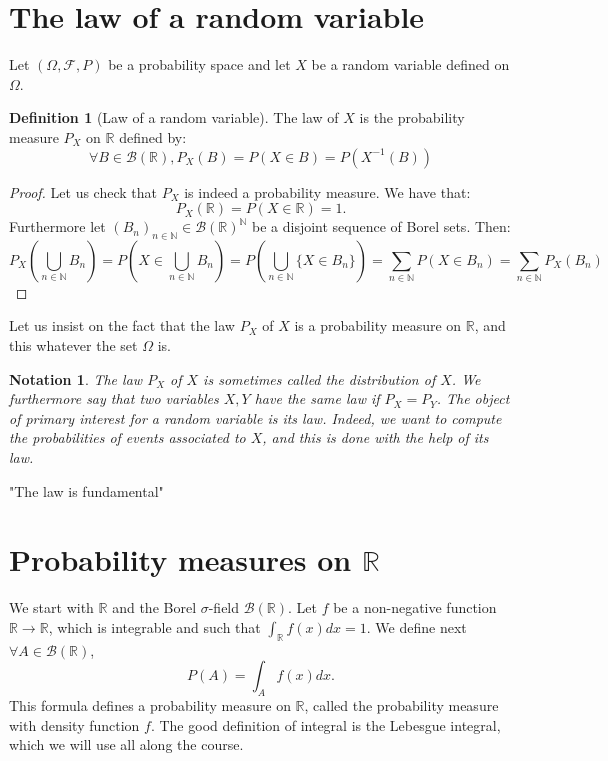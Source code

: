 \documentclass[10pt,a4paper]{book}
\newtheorem*{notation}{Notation}
\theoremstyle{definition}
\newtheorem{definition}{Definition}[section]
\begin{document}
\section{The law of a random variable}
Let $(\Omega, \mathcal{F}, P)$ be a probability space and let $X$ be a random variable defined on $\Omega$.
\begin{definition}[Law of a random variable]
 The law of $X$ is the probability measure $P_X$ on $\mathbb{R}$ defined by:
\[
\forall B \in \mathcal{B}(\mathbb{R}), P_X(B) = P(X \in B)=P(X^{-1}(B))
\]
\end{definition}

\begin{proof}
Let us check that $P_X$ is indeed a probability measure. We have that:
\[
P_X(\mathbb{R}) = P(X \in \mathbb{R}) = 1.
\]
Furthermore let $(B_n)_{n \in \mathbb{N}} \in \mathcal{B}(\mathbb{R})^\mathbb{N}$ be a disjoint sequence of Borel sets. Then:
\[
P_X\left(\bigcup_{n \in \mathbb{N}} B_n\right) = P\left(X \in \bigcup_{n\in\mathbb{N}} B_n\right) = P\left( \bigcup_{n\in\mathbb{N}} \{ X \in B_n \} \right) = \sum_{n \in \mathbb{N}} P(X \in B_n) = \sum_{n \in \mathbb{N}} P_X(B_n)
\]
\end{proof}
Let us insist on the fact that the law $P_X$ of $X$ is a probability measure on $\mathbb{R}$, and this whatever the set $\Omega$ is.
\begin{notation}
The law $P_X$ of $X$ is sometimes called the \textit{distribution} of $X$. We furthermore say that two variables $X, Y$ have the same law if $P_X = P_Y$. The object of primary interest for a random variable is its law. Indeed, we want to compute the probabilities of events associated to $X$, and this is done with the help of its law.
\end{notation}
"The law is fundamental"

\section{Probability measures on $\mathbb{R}$}
We start with $\mathbb{R}$ and the Borel $\sigma$-field $\mathcal{B}(\mathbb{R})$. Let $f$ be a non-negative function $\mathbb{R}\to\mathbb{R}$, which is integrable and such that $\int_{\mathbb{R}}f(x)dx=1$. We define next $\forall A\in\mathcal{B}(\mathbb{R})$, $$P(A)=\int_A f(x)dx.$$
This formula defines a probability measure on $\mathbb{R}$, called the probability measure with density function $f$.
The good definition of integral is the Lebesgue integral, which we will use all along the course. 
\end{document}
